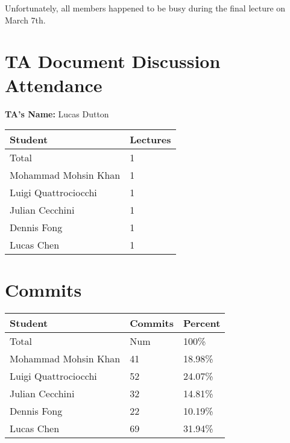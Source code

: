 \documentclass{article}
\begin{document}
Unfortunately, all members happened to be busy during the final lecture on March 7th.

\section{TA Document Discussion Attendance}


\noindent \textbf{TA's Name: } Lucas Dutton

\begin{table}[H]
\centering
\begin{tabular}{ll}
\toprule
\textbf{Student} & \textbf{Lectures}\\
\midrule
Total & 1\\
Mohammad Mohsin Khan & 1\\
Luigi Quattrociocchi & 1\\
Julian Cecchini & 1\\
Dennis Fong & 1\\
Lucas Chen & 1\\
\bottomrule
\end{tabular}
\end{table}


\section{Commits}


\begin{table}[H]
\centering
\begin{tabular}{lll}
\toprule
\textbf{Student} & \textbf{Commits} & \textbf{Percent}\\
\midrule
Total & Num & 100\% \\
Mohammad Mohsin Khan & 41 & 18.98\% \\
Luigi Quattrociocchi & 52 & 24.07\% \\
Julian Cecchini & 32 & 14.81\% \\
Dennis Fong & 22 & 10.19\% \\
Lucas Chen & 69 & 31.94\% \\
\bottomrule
\end{tabular}
\end{table}
\end{document}
